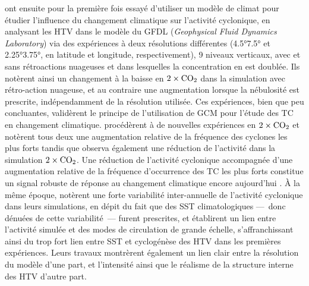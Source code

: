 \documentclass[../main.tex]{subfiles}
\begin{document}
\cite{broccoli_can_1990} ont ensuite pour la première fois essayé d'utiliser un modèle de climat pour étudier l'influence du changement climatique sur
l'activité cyclonique, en analysant les HTV dans le modèle du GFDL (\textit{Geophysical Fluid Dynamics Laboratory}) via des expériences à deux résolutions
différentes (\ang{4.5}\times\ang{7.5} et \ang{2.25}\times\ang{3.75}, en latitude et longitude, respectivement), \num{9} niveaux verticaux, avec et sans
rétroactions nuageuses et dans lesquelles la concentration en  est doublée. Ils notèrent ainsi un changement à la baisse en
\ensuremath{2\times\ce{CO2}} dans la simulation avec rétro-action nuageuse, et au contraire une augmentation lorsque la nébulosité est prescrite, indépendamment
de la résolution utilisée. Ces expériences, bien que peu concluantes, validèrent le principe de l'utilisation de GCM pour l'étude des TC en changement
climatique. \cite{haarsma_tropical_1993,bengtsson_will_1996} procédèrent à de nouvelles expériences en \ensuremath{2\times\ce{CO2}} et notèrent tous deux une augmentation
relative de la fréquence des cyclones les plus forts tandis que \cite{bengtsson_will_1996} observa également une réduction de l'activité dans la
simulation \ensuremath{2\times\ce{CO2}}. Une réduction de l'activité cyclonique accompagnée d'une augmentation relative de la fréquence d'occurrence des TC les
plus forts constitue un signal robuste de réponse au changement climatique encore aujourd'hui \parencite[][voir
\cref{sec:projections_futures}]{walsh_tropical_2016,camargo_tropical_2016,knutson_tropical_2010,knutson_tropical_2010,seneviratne_weather_2021}. À la même
époque, \cite{bengtsson_hurricanetype_1995} notèrent une forte variabilité inter-annuelle de l'activité cyclonique dans leurs simulations, en dépit du fait que
des SST climatologiques ---~donc dénuées de cette variabilité~--- furent prescrites, et établirent un lien entre l'activité simulée et des modes de circulation
de grande échelle, s'affranchissant ainsi du trop fort lien entre SST et cyclogénèse des HTV dans les premières expériences. Leurs travaux montrèrent également
un lien clair entre la résolution du modèle d'une part, et l'intensité ainsi que le réalisme de la structure interne des HTV d'autre part.
\end{document}
